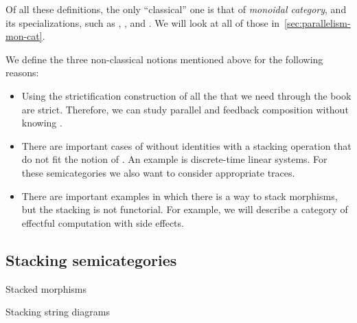 \begin{remark}
    Of all these definitions, the only ``classical'' one is that of \emph{monoidal category}, and its specializations, such as , , and .
    We will look at all of those in~\cref{sec:parallelism-mon-cat}.

    We define the three non-classical notions mentioned above for the following reasons:
    \begin{itemize}
        \item Using the strictification construction of \SetL all the  that we need through the book are strict.
              Therefore, we can study parallel and feedback composition without knowing .

        \item There are important cases of  without identities with a stacking operation that do not fit the notion of .
              An example is discrete-time linear systems.
              For these semicategories we also want to consider appropriate traces.
        \item There are important examples in which there is a way to stack morphisms, but the stacking is not functorial.
              For example, we will describe a category of effectful computation with side effects.
    \end{itemize}
\end{remark}

\subsection{Stacking semicategories}

\begin{marginfigure}
    \centering
    \caption{Stacked morphisms}
    \label{fig:stacked-morphisms}
\end{marginfigure}

\begin{marginfigure}
    \centering
    \caption{Stacking string diagrams}
    \label{fig:stacked-morphisms-diagram}
\end{marginfigure}

